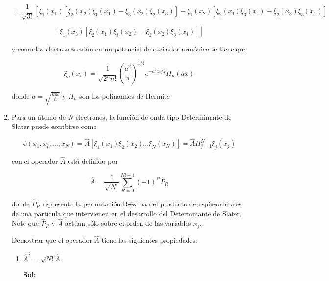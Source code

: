 \documentclass[12pt,a4paper]{article}
\begin{document}
\begin{enumerate}
\begin{equation*}
    =\frac{1}{\sqrt{3!}}\left[ \xi_1 (x_1) [\xi_2 (x_2) \xi_1 (x_1) - \xi_3 (x_2) \xi_2 (x_3)] - \xi_1 (x_2) [\xi_2(x_1)\xi_3(x_3) - \xi_2(x_3)\xi_3(x_1)] \right.
\end{equation*}

\begin{equation*}
    \left. + \xi_1 (x_3) [\xi_2 (x_1) \xi_3 (x_2) - \xi_2(x_2) \xi_3 (x_1)]\right]
\end{equation*}

y como los electrones están en un potencial de oscilador armónico se tiene que

\begin{equation*}
    \xi_n (x_i) = \frac{1}{\sqrt{2^n n!}}\left(\frac{a^2}{\pi}\right)^{1/4} e^{-a^2 x_i/2} H_n (ax)
\end{equation*}

donde $a = \sqrt{\frac{m \omega}{\hbar}}$ y $H_n$ son los polinomios de Hermite






\item Para un átomo de $N$ electrones, la función de onda tipo Determinante de Slater puede escribirse como

\begin{equation*}
    \phi(x_1,x_2,...,x_N) = \hat{A}[\xi_1 (x_1)\xi_2(x_2) ... \xi_N (x_N)] = \hat{A} \Pi_{j=1}^{N} \xi_{j} (x_j)
\end{equation*}

con el operador $\hat{A}$ está definido por

\begin{equation*}
    \hat{A} = \frac{1}{\sqrt{N!}} \sum_{R =0}^{N!-1}(-1)^{R} \hat{P}_{R}
\end{equation*}

donde $\hat{P}_{R}$ representa la permutación R-ésima del producto de espín-orbitales de una partícula que intervienen en el desarrollo del Determinante de Slater. Note que $\hat{P}_{R}$ y $\hat{A}$ actúan sólo sobre el orden de las variables $x_j$.

Demostrar que el operador $\hat{A}$ tiene las siguientes propiedades:

\begin{enumerate}
    \item $\hat{A}^2 = \sqrt{N!}\hat{A}$
    
    \textbf{Sol:}


\end{enumerate}
\end{enumerate}
\end{document}
